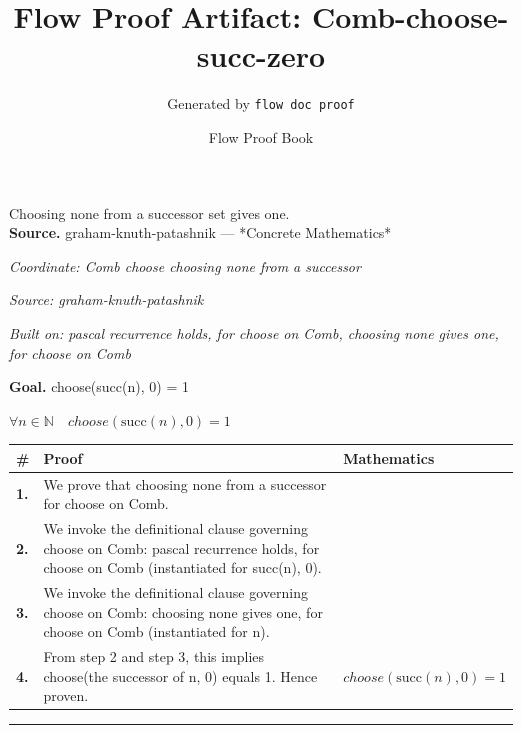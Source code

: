 \documentclass[11pt]{article}
\title{Flow Proof Artifact: Comb-choose-succ-zero}
\author{Generated by \texttt{flow doc proof}}
\date{Flow Proof Book}
\theoremstyle{definition}
\begin{document}
\maketitle
Choosing none from a successor set gives one.\\[0.5em]
\textbf{Source.} graham-knuth-patashnik — *Concrete Mathematics*\\[0.5em]
\bigskip
{}\par
\smallskip\noindent\textit{Coordinate: Comb \cdot choose \cdot choosing none from a successor}\par
\smallskip\noindent\textit{Source: graham-knuth-patashnik}\par
\smallskip\noindent\textit{Built on: pascal recurrence holds, for choose on Comb, choosing none gives one, for choose on Comb}\par
\medskip
\noindent\textbf{Goal.} choose(succ(n), 0) = 1\par
\noindent$\displaystyle \forall n \in \mathbb{N}\quad choose(\mathrm{succ}(n), 0) = 1$\par
\medskip
\noindent
\begin{tabular}{@{} >{\raggedright\arraybackslash}p{} >{\raggedright\arraybackslash}p{} >{\raggedleft\arraybackslash}p{} @{}}
\textbf{\#} & \textbf{Proof} & \textbf{Mathematics} \\
\midrule
\textbf{1.} & We prove that choosing none from a successor for choose on Comb. & \\[0.45em]
\textbf{2.} & We invoke the definitional clause governing choose on Comb: pascal recurrence holds, for choose on Comb (instantiated for succ(n), 0). & \\[0.45em]
\textbf{3.} & We invoke the definitional clause governing choose on Comb: choosing none gives one, for choose on Comb (instantiated for n). & \\[0.45em]
\textbf{4.} & From step 2 and step 3, this implies choose(the successor of n, 0) equals 1. Hence proven. & $\displaystyle choose(\mathrm{succ}(n), 0) = 1$ \\[0.45em]
\bottomrule
\end{tabular}
\label{thm:Comb-choose-choosing_none_from_a_successor}
\par\medskip\hrule
\end{document}
